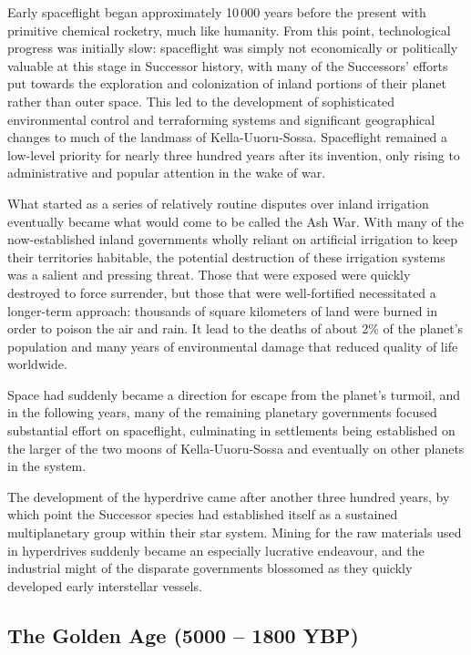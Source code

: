\documentclass[11pt]{report}
\begin{document}
    Early spaceflight began approximately 10\,000 years before the present with primitive chemical rocketry, much like humanity. From this point, technological progress was initially slow: spaceflight was simply not economically or politically valuable at this stage in Successor history, with many of the Successors' efforts put towards the exploration and colonization of inland portions of their planet rather than outer space. This led to the development of sophisticated environmental control and terraforming systems and significant geographical changes to much of the landmass of Kella-Uuoru-Sossa. Spaceflight remained a low-level priority for nearly three hundred years after its invention, only rising to administrative and popular attention in the wake of war.

    What started as a series of relatively routine disputes over inland irrigation eventually became what would come to be called the Ash War. With many of the now-established inland governments wholly reliant on artificial irrigation to keep their territories habitable, the potential destruction of these irrigation systems was a salient and pressing threat. Those that were exposed were quickly destroyed to force surrender, but those that were well-fortified necessitated a longer-term approach: thousands of square kilometers of land were burned in order to poison the air and rain. It lead to the deaths of about 2\% of the planet's population and many years of environmental damage that reduced quality of life worldwide.
    
    Space had suddenly became a direction for escape from the planet's turmoil, and in the following years, many of the remaining planetary governments focused substantial effort on spaceflight, culminating in settlements being established on the larger of the two moons of Kella-Uuoru-Sossa and eventually on other planets in the system.

    The development of the hyperdrive came after another three hundred years, by which point the Successor species had established itself as a sustained multiplanetary group within their star system. Mining for the raw materials used in hyperdrives suddenly became an especially lucrative endeavour, and the industrial might of the disparate governments blossomed as they quickly developed early interstellar vessels.

    \subsection{The Golden Age (5000 -- 1800 YBP)}
\end{document}
